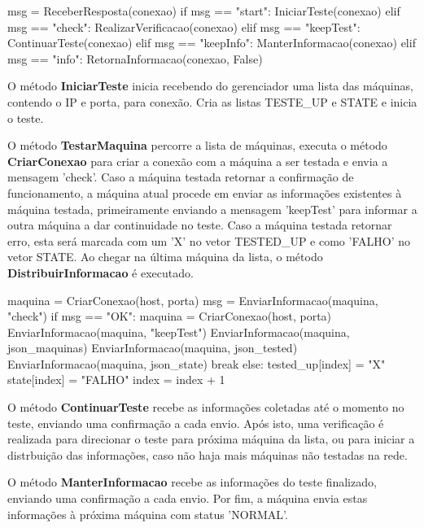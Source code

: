\vspace*{1cm}
\begin{python}
    msg = ReceberResposta(conexao)
    if msg == "start":
        IniciarTeste(conexao)
    elif msg == "check":
        RealizarVerificacao(conexao)
    elif msg == "keepTest":
        ContinuarTeste(conexao)
    elif msg == "keepInfo":
        ManterInformacao(conexao)
    elif msg == "info":
        RetornaInformacao(conexao, False)
\end{python}
\vspace*{1cm}

O método \textbf{IniciarTeste} inicia recebendo do gerenciador uma lista das máquinas, contendo o IP e porta, para conexão. Cria as listas TESTE\_UP e STATE e inicia o teste.

O método \textbf{TestarMaquina} percorre a lista de máquinas, executa o método \textbf{CriarConexao} para criar a conexão com a máquina a ser testada e envia a mensagem 'check'. Caso 
a máquina testada retornar a confirmação de funcionamento, a máquina atual procede em enviar as informações existentes à máquina testada, primeiramente enviando a mensagem 'keepTest' para informar a outra máquina 
a dar continuidade no teste. Caso a máquina testada retornar erro, esta será marcada com um 'X' no vetor TESTED\_UP e como 'FALHO' no vetor STATE.
Ao chegar na última máquina da lista, o método \textbf{DistribuirInformacao} é executado.

\vspace*{1cm}
\begin{python}
    maquina = CriarConexao(host, porta)
    msg = EnviarInformacao(maquina, "check")
    if msg == "OK":
        maquina = CriarConexao(host, porta)
        EnviarInformacao(maquina, "keepTest")
        EnviarInformacao(maquina, json_maquinas)
        EnviarInformacao(maquina, json_tested)
        EnviarInformacao(maquina, json_state)
        break
    else:
        tested_up[index] = "X"
        state[index] = "FALHO"
        index = index + 1
\end{python}
\vspace*{1cm}

O método \textbf{ContinuarTeste} recebe as informações coletadas até o momento no teste, enviando uma confirmação a cada envio. Após isto, uma verificação é realizada para direcionar 
o teste para próxima máquina da lista, ou para iniciar a distrbuição das informações, caso não haja mais máquinas não testadas na rede.

O método \textbf{ManterInformacao} recebe as informações do teste finalizado, enviando uma confirmação a cada envio. Por fim, a máquina envia estas informações à próxima máquina com status 
'NORMAL'.

